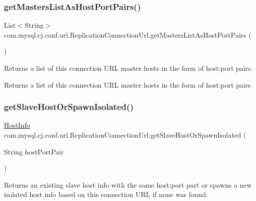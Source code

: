 \subsubsection{\texorpdfstring{get\+Masters\+List\+As\+Host\+Port\+Pairs()}{getMastersListAsHostPortPairs()}}
{\footnotesize\ttfamily List$<$String$>$ com.\+mysql.\+cj.\+conf.\+url.\+Replication\+Connection\+Url.\+get\+Masters\+List\+As\+Host\+Port\+Pairs (\begin{DoxyParamCaption}{ }\end{DoxyParamCaption})}

Returns a list of this connection U\+RL master hosts in the form of host\+:port pairs.

\begin{DoxyReturn}{Returns}
a list of this connection U\+RL master hosts in the form of host\+:port pairs 
\end{DoxyReturn}
\mbox{\label{classcom_1_1mysql_1_1cj_1_1conf_1_1url_1_1_replication_connection_url_a7f3ecb4637ad23b6731d2fc9f70c55dd}} 
\subsubsection{\texorpdfstring{get\+Slave\+Host\+Or\+Spawn\+Isolated()}{getSlaveHostOrSpawnIsolated()}}
{\footnotesize\ttfamily \mbox{\hyperlink{classcom_1_1mysql_1_1cj_1_1conf_1_1_host_info}{Host\+Info}} com.\+mysql.\+cj.\+conf.\+url.\+Replication\+Connection\+Url.\+get\+Slave\+Host\+Or\+Spawn\+Isolated (\begin{DoxyParamCaption}\item[{String}]{host\+Port\+Pair }\end{DoxyParamCaption})}

Returns an existing slave host info with the same host\+:port part or spawns a new isolated host info based on this connection U\+RL if none was found.


